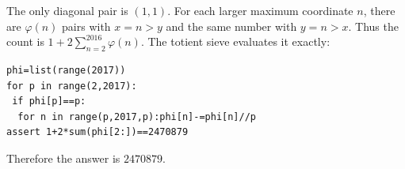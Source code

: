 The only diagonal pair is $(1,1)$. For each larger maximum coordinate $ n $, there are $\varphi(n)$ pairs with $ x=n>y $ and the same number with $ y=n>x $. Thus the count is $ 1+2\sum_{n=2}^{2016}\varphi(n)$. The totient sieve evaluates it exactly:
\begin{verbatim}
phi=list(range(2017))
for p in range(2,2017):
 if phi[p]==p:
  for n in range(p,2017,p):phi[n]-=phi[n]//p
assert 1+2*sum(phi[2:])==2470879
\end{verbatim}
Therefore the answer is $\boxed{2470879}$.
